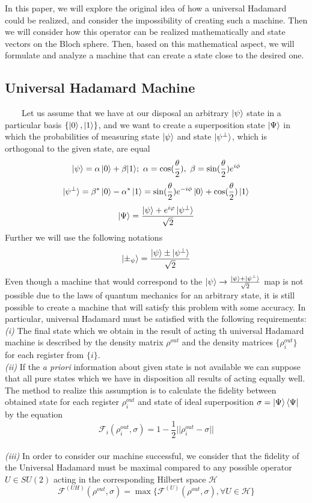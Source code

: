 \documentclass[english,14pt,a4paper]{article}
\begin{document}
	In this paper, we will explore the original idea of how a universal Hadamard could be realized, and consider the impossibility of creating such a machine. Then we will consider how this operator can be realized mathematically and state vectors on the Bloch sphere. Then, based on this mathematical aspect, we will formulate and analyze a machine that can create a state close to the desired one. 
	
	\subsection{Universal Hadamard Machine} \ \ \ \
	Let us assume that we have at our disposal an arbitrary $\ket{\psi}$ state in a particular basis $\{\ket{0}, \ket{1}\}$, and we want to create a superposition state $\ket{\Psi}$ in which the probabilities of measuring state $\ket{\psi}$ and state $\ket{\psi^{\perp}}$, which is orthogonal to the given state, are equal
	\[ \ket{\psi} = \alpha\ket{0} + \beta{\ket{1}}; \ \alpha = \cos(\frac{\theta}{2}), \ \beta = \sin(\frac{\theta}{2})e^{i\phi}\]
	\[\ket{\psi^{\perp}} = \beta^{*}\ket{0} - \alpha^{*}\ket{1} = \sin(\frac{\theta}{2})e^{-i\phi}\ket{0} + \cos(\frac{\theta}{2})\ket{1}\]
	\[\ket{\Psi} = \frac{\ket{\psi} + e^{i\varphi}\ket{\psi^{\perp}}}{\sqrt{2}}\]
	Further we will use the following notations
	\[ \ket{\pm_{\psi}} = \frac{\ket{\psi} \pm \ket{\psi^{\perp}}}{\sqrt{2}}\]
	Even though a machine that would correspond to the $\ket{\psi} \rightarrow \frac{\ket{\psi} + \ket{\psi^{\perp}}}{\sqrt{2}}$ map is not possible due to the laws of quantum mechanics for an arbitrary state, it is still possible to create a machine that will satisfy this problem with some accuracy. In particular, universal Hadamard must be satisfied with the following requirements: \\
	\textit{(i)}  The final state which we obtain in the result of acting th universal Hadamard machine is described by the density matrix $\rho^{out}$ and the density matrices $\{\rho_i^{out}\}$ for each register from $\{i\}$.\\
	\textit{(ii)} If the \textit{a priori} information about given state is not available we can suppose that all pure states which we have in disposition all results of acting equally well. The method to realize this assumption is to calculate the fidelity between obtained state  for each register $\rho^{out}_i$ and state of ideal superposition $\sigma = \ket{\Psi}\bra{\Psi}$ by the equation
	\[\mathcal{F}_i(\rho_i^{out}, \sigma) = 1 - \frac12 ||\rho_i^{out} - \sigma||\]\\
	\textit{(iii)} In order to consider our machine successful, we consider that the fidelity of the Universal Hadamard must be maximal compared to any possible operator $U \in SU(2)$ acting in the corresponding Hilbert space $\mathcal{H}$
	\[\mathcal{F}^{(UH)}(\rho^{out}, \sigma) = \max\{\mathcal{F}^{(U)}(\rho^{out}, \sigma), \forall U \in \mathcal{H}\}\]
	
\end{document}
